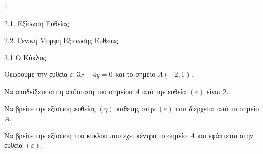 \begin{ylh}{1}
    \item 2.1. Εξίσωση Ευθείας
    \item 2.2. Γενική Μορφή Εξίσωσης Ευθείας
    \item 3.1 Ο Κύκλος.
\end{ylh}
Θεωρούμε την ευθεία $\varepsilon: 3x - 4y = 0$ και το σημείο $A(-2,1)$.
\begin{alist}
\item Να αποδείξετε ότι η απόσταση του σημείου $A$ από την ευθεία $(\varepsilon)$ είναι 2. 
\item Να βρείτε την εξίσωση ευθείας $(\eta)$ κάθετης στην $(\varepsilon)$ που διέρχεται από το σημείο $A$. 
\item Να βρείτε την εξίσωση του κύκλου που έχει κέντρο το σημείο $A$ και εφάπτεται στην ευθεία $(\varepsilon)$. 
\end{alist}